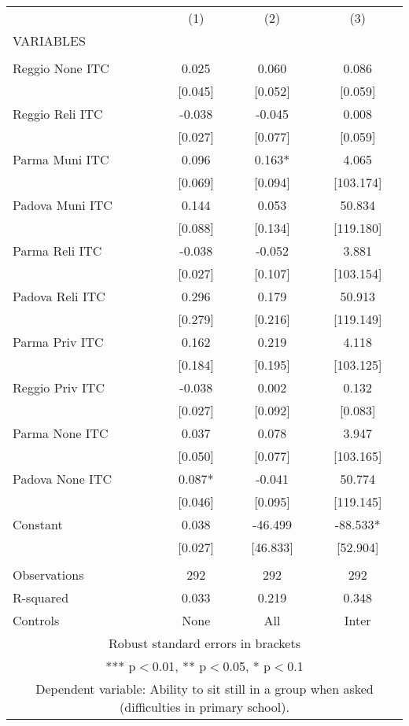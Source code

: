 \begin{tabular}{lccc} \hline
 & (1) & (2) & (3) \\
VARIABLES &  &  &  \\ \hline
 &  &  &  \\
Reggio None ITC & 0.025 & 0.060 & 0.086 \\
 & [0.045] & [0.052] & [0.059] \\
Reggio Reli ITC & -0.038 & -0.045 & 0.008 \\
 & [0.027] & [0.077] & [0.059] \\
Parma Muni ITC & 0.096 & 0.163* & 4.065 \\
 & [0.069] & [0.094] & [103.174] \\
Padova Muni ITC & 0.144 & 0.053 & 50.834 \\
 & [0.088] & [0.134] & [119.180] \\
Parma Reli ITC & -0.038 & -0.052 & 3.881 \\
 & [0.027] & [0.107] & [103.154] \\
Padova Reli ITC & 0.296 & 0.179 & 50.913 \\
 & [0.279] & [0.216] & [119.149] \\
Parma Priv ITC & 0.162 & 0.219 & 4.118 \\
 & [0.184] & [0.195] & [103.125] \\
Reggio Priv ITC & -0.038 & 0.002 & 0.132 \\
 & [0.027] & [0.092] & [0.083] \\
Parma None ITC & 0.037 & 0.078 & 3.947 \\
 & [0.050] & [0.077] & [103.165] \\
Padova None ITC & 0.087* & -0.041 & 50.774 \\
 & [0.046] & [0.095] & [119.145] \\
Constant & 0.038 & -46.499 & -88.533* \\
 & [0.027] & [46.833] & [52.904] \\
 &  &  &  \\
Observations & 292 & 292 & 292 \\
R-squared & 0.033 & 0.219 & 0.348 \\
 Controls & None & All & Inter \\ \hline
\multicolumn{4}{c}{ Robust standard errors in brackets} \\
\multicolumn{4}{c}{ *** p$<$0.01, ** p$<$0.05, * p$<$0.1} \\
\multicolumn{4}{c}{ Dependent variable: Ability to sit still in a group when asked (difficulties in primary school).} \\
\end{tabular}

